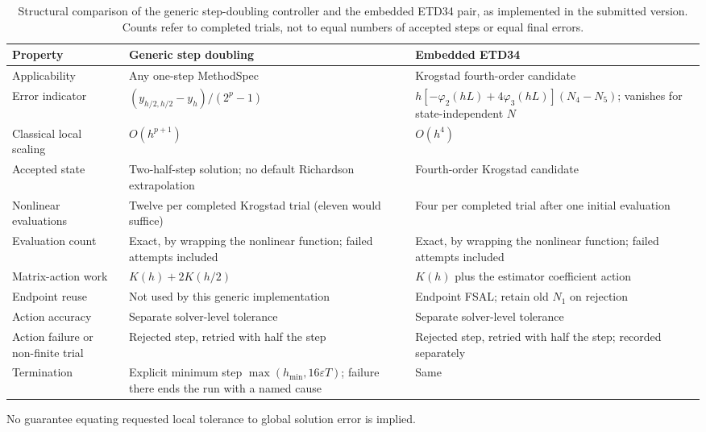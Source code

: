 \begin{table}[!htbp]
\centering\small
\caption{Structural comparison of the generic step-doubling controller and the embedded ETD34 pair, as implemented in the submitted version. Counts refer to completed trials, not to equal numbers of accepted steps or equal final errors.}\label{tab:adaptivity}
\begin{tabularx}{\linewidth}{@{}p{3.05cm}X X@{}}\toprule
Property & Generic step doubling & Embedded ETD34\\\midrule
Applicability & Any one-step MethodSpec & Krogstad fourth-order candidate\\\addlinespace
Error indicator & $(y_{h/2,h/2}-y_h)/(2^p-1)$ & $h[-\varphi_2(hL)+4\varphi_3(hL)](N_4-N_5)$; vanishes for state-independent $N$\\\addlinespace
Classical local scaling & $O(h^{p+1})$ & $O(h^4)$\\\addlinespace
Accepted state & Two-half-step solution; no default Richardson extrapolation & Fourth-order Krogstad candidate\\\addlinespace
Nonlinear evaluations & Twelve per completed Krogstad trial (eleven would suffice) & Four per completed trial after one initial evaluation\\\addlinespace
Evaluation count & Exact, by wrapping the nonlinear function; failed attempts included & Exact, by wrapping the nonlinear function; failed attempts included\\\addlinespace
Matrix-action work & $K(h)+2K(h/2)$ & $K(h)$ plus the estimator coefficient action\\\addlinespace
Endpoint reuse & Not used by this generic implementation & Endpoint FSAL; retain old $N_1$ on rejection\\\addlinespace
Action accuracy & Separate solver-level tolerance & Separate solver-level tolerance\\\addlinespace
Action failure or non-finite trial & Rejected step, retried with half the step & Rejected step, retried with half the step; recorded separately\\\addlinespace
Termination & Explicit minimum step $\max(h_{\min},16\varepsilon T)$; failure there ends the run with a named cause & Same\\\bottomrule
\end{tabularx}
\par\smallskip\footnotesize
No guarantee equating requested local tolerance to global solution error is implied.
\end{table}
